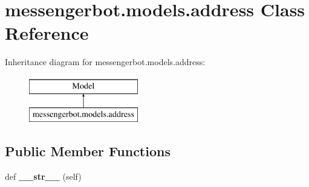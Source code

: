 \hypertarget{classmessengerbot_1_1models_1_1address}{}\section{messengerbot.\+models.\+address Class Reference}
\label{classmessengerbot_1_1models_1_1address}
Inheritance diagram for messengerbot.\+models.\+address\+:\begin{figure}[H]
\begin{center}
\leavevmode
\includegraphics[height=2.000000cm]{classmessengerbot_1_1models_1_1address}
\end{center}
\end{figure}
\subsection*{Public Member Functions}
\begin{DoxyCompactItemize}
\item 
\mbox{\label{classmessengerbot_1_1models_1_1address_a5f4ba5826fd95684762687c69473961f}} 
def {\bfseries \+\_\+\+\_\+str\+\_\+\+\_\+} (self)
\end{DoxyCompactItemize}
